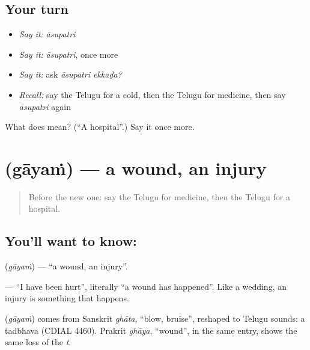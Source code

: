 \subsection*{Your turn}
\begin{itemize}
\raggedright
  \item \emph{Say it:} \emph{āsupatri}
  \item \emph{Say it:} \emph{āsupatri}, once more
  \item \emph{Say it:} ask \emph{āsupatri ekkaḍa?}
  \item \emph{Recall:} say the Telugu for a cold, then the Telugu for medicine, then say \emph{āsupatri} again
\end{itemize}

\begin{tcolorbox}[breakable,colback=teal!4,colframe=teal!35!black,title={Before you move on}]
What does  mean? (\textquotedblleft{}A hospital\textquotedblright{}.) Say it once more.
\end{tcolorbox}
\section[\texorpdfstring{\te{గాయం} (gāyaṁ)}{గాయం (gāyaṁ)}]{ (gāyaṁ) — a wound, an injury}

\label{lesson:TE-C92-wound}



\begin{quote}
Before the new one: say the Telugu for medicine, then the Telugu for a hospital.
\end{quote}

\subsection*{You'll want to know: }
\textbf{} (\emph{gāyaṁ}) — \textquotedblleft{}a wound, an injury\textquotedblright{}.

\textbf{ } — \textquotedblleft{}I have been hurt\textquotedblright{}, literally \textquotedblleft{}a wound has happened\textquotedblright{}. Like a wedding, an injury is something that happens.

\begin{cousinweb}
\textbf{} (\emph{gāyaṁ}) comes from Sanskrit \emph{ghāta}, \textquotedblleft{}blow, bruise\textquotedblright{}, reshaped to Telugu sounds: a tadbhava (CDIAL 4460). Prakrit \emph{ghāya}, \textquotedblleft{}wound\textquotedblright{}, in the same entry, shows the same loss of the \emph{t}.
\end{cousinweb}

